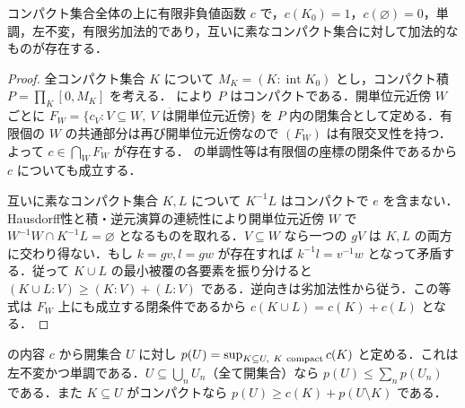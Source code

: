 \begin{prop}[コンパクト集合上の不変加法的内容]
コンパクト集合全体の上に有限非負値函数 $c$ で，$c(K_0)=1$，$c(\varnothing)=0$，単調，左不変，有限劣加法的であり，互いに素なコンパクト集合に対して加法的なものが存在する．
\end{prop}
\begin{proof}
全コンパクト集合 $K$ について $M_K=(K:\operatorname{int}K_0)$ とし，コンパクト積 $P=\prod_K[0,M_K]$ を考える． により $P$ はコンパクトである．開単位元近傍 $W$ ごとに $F_W=\overline{\{c_V:V\subseteq W,\ V\text{ は開単位元近傍}\}}$ を $P$ 内の閉集合として定める．有限個の $W$ の共通部分は再び開単位元近傍なので $(F_W)$ は有限交叉性を持つ．よって $c\in\bigcap_W F_W$ が存在する． の単調性等は有限個の座標の閉条件であるから $c$ についても成立する．

互いに素なコンパクト集合 $K,L$ について $K^{-1}L$ はコンパクトで $e$ を含まない．Hausdorff性と積・逆元演算の連続性により開単位元近傍 $W$ で $W^{-1}W\cap K^{-1}L=\varnothing$ となるものを取れる．$V\subseteq W$ なら一つの $gV$ は $K,L$ の両方に交わり得ない．もし $k=gv,l=gw$ が存在すれば $k^{-1}l=v^{-1}w$ となって矛盾する．従って $K\cup L$ の最小被覆の各要素を振り分けると $(K\cup L:V)\geq(K:V)+(L:V)$ である．逆向きは劣加法性から従う．この等式は $F_W$ 上にも成立する閉条件であるから $c(K\cup L)=c(K)+c(L)$ となる．
\end{proof}
\begin{prop}[開集合への拡張と被覆不等式]
 の内容 $c$ から開集合 $U$ に対し $p(U)=\sup_{K\subseteq U,\ K\ {\rm compact}}c(K)$ と定める．これは左不変かつ単調である．$U\subseteq\bigcup_n U_n$（全て開集合）なら $p(U)\leq\sum_np(U_n)$ である．また $K\subseteq U$ がコンパクトなら $p(U)\geq c(K)+p(U\setminus K)$ である．
\end{prop}
